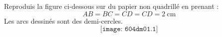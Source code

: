 Reproduis la figure ci-dessous sur du papier non quadrillé en prenant
:
\[AB=BC=CD=CD=2~\mbox{cm}\]
Les arcs dessinés sont des demi-cercles.
\[\texttt{[image: 604dm01.1]}\]